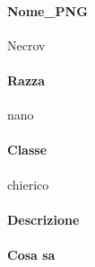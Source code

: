 \documentclass{article}
\begin{document}
\paragraph{Nome\_PNG}Necrov
\paragraph{Razza} nano
\paragraph{Classe} chierico
\paragraph{Descrizione}  
\paragraph{Cosa sa}
\end{document}
